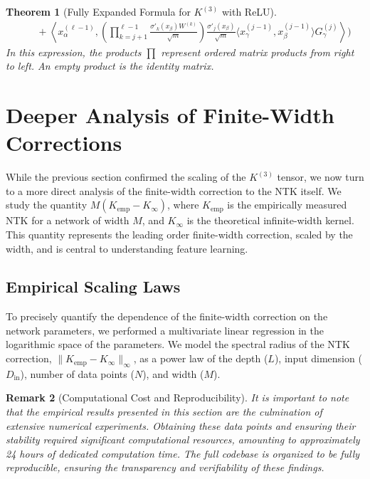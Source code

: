 \documentclass{article}
\newtheorem{theorem}{Theorem}[section]
\newtheorem{remark}[theorem]{Remark}
\begin{document}
\begin{theorem}[Fully Expanded Formula for $K^{(3)}$ with ReLU]
\begin{align}
& \quad + \left\langle x^{(\ell-1)}_\alpha, \left( \prod_{k=j+1}^{\ell-1} \frac{\sigma'_{k}(x_\beta) W^{(k)}}{\sqrt{m}} \right) \frac{\sigma'_{j}(x_\beta)}{\sqrt{m}} \langle x^{(j-1)}_\gamma, x^{(j-1)}_\beta \rangle G^{(j)}_\gamma \right\rangle \Biggr)
\end{align}
In this expression, the products $\prod$ represent ordered matrix products from right to left. An empty product is the identity matrix.
\end{theorem}


\newpage

\section{Deeper Analysis of Finite-Width Corrections}

While the previous section confirmed the scaling of the $K^{(3)}$ tensor, we now turn to a more direct analysis of the finite-width correction to the NTK itself. We study the quantity $M(K_{\text{emp}} - K_{\infty})$, where $K_{\text{emp}}$ is the empirically measured NTK for a network of width $M$, and $K_{\infty}$ is the theoretical infinite-width kernel. This quantity represents the leading order finite-width correction, scaled by the width, and is central to understanding feature learning.

\subsection{Empirical Scaling Laws}

To precisely quantify the dependence of the finite-width correction on the network parameters, we performed a multivariate linear regression in the logarithmic space of the parameters. We model the spectral radius of the NTK correction, $\|K_{\text{emp}} - K_{\infty}\|_\infty$, as a power law of the depth ($L$), input dimension ($D_{\text{in}}$), number of data points ($N$), and width ($M$).

\begin{remark}[Computational Cost and Reproducibility]
It is important to note that the empirical results presented in this section are the culmination of extensive numerical experiments. Obtaining these data points and ensuring their stability required significant computational resources, amounting to approximately 24 hours of dedicated computation time. The full codebase is organized to be fully reproducible, ensuring the transparency and verifiability of these findings.
\end{remark}
\end{document}
